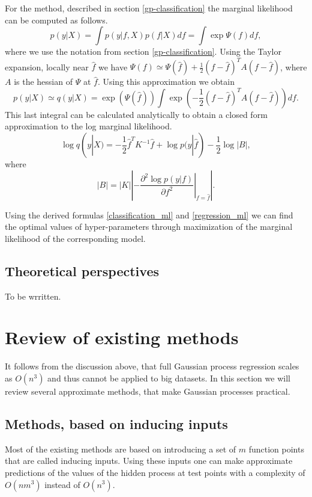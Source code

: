 \documentclass[12pt]{article}
\begin{document}
	For the method, described in section \ref{gp-classification} the marginal likelihood can be computed as follows.
	$$p(y | X) = \int p(y | f, X) p(f | X) df = \int \exp{\Psi(f)} df,$$
	where we use the notation from section \ref{gp-classification}. Using the Taylor expansion, locally near $\hat f$ we have $\Psi(f) \simeq \Psi(\hat f) + \frac 1 2(f - \hat f)^T A (f - \hat f)$, where $A$ is the hessian of $\Psi$ at $\hat f$. Using this approximation we obtain
	$$p(y | X) \simeq q(y | X) = \exp(\Psi(\hat f)) \int \exp( - \frac 1 2 (f - \hat f)^T A (f - \hat f)) df.$$
	This last integral can be calculated analytically to obtain a closed form approximation to the log marginal likelihood. 
	\begin{equation}
		\label{classification_ml}
		\log q(y|X) = -\frac 1 2 \hat f^T K^{-1} \hat f + \log p(y|\hat f) - \frac 1 2 \log|B|,
	\end{equation}
	where 
	$$|B| = |K| \left|- \left. \frac{\partial^2 \log p(y | f)}{\partial f^2} \right|_{f = \hat f} \right|.$$ 

	Using the derived formulas \ref{classification_ml} and \ref{regression_ml} we can find the optimal values of hyper-parameters through maximization of the marginal likelihood of the corresponding model.
	
\subsection{Theoretical perspectives}
	\hspace{0.6cm}To be wrritten.

\pagebreak
\section{Review of existing methods}

It follows from the discussion above, that full Gaussian process regression scales as $O(n^3)$ and thus cannot be applied to big datasets. In this section we will review several approximate methods, that make Gaussian processes practical.

\subsection{Methods, based on inducing inputs}
	Most of the existing methods are based on introducing a set of $m$ function points that are called inducing inputs. Using these inputs one can make approximate predictions of the values of the hidden process at test points with a complexity of $O(nm^3)$ instead of $O(n^3)$.
	
\end{document}
